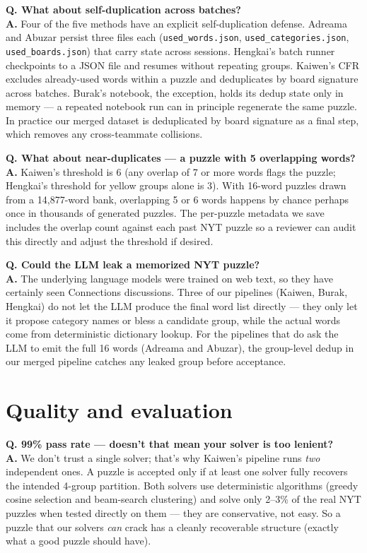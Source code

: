 \documentclass[11pt, letterpaper]{article}
\newcommand{\qitem}[1]{\vspace{0.6em}\noindent\textbf{\color{accent}Q. #1}\\[0.2em]}
\newcommand{\aitem}{\noindent\textbf{A.} }
\begin{document}
\qitem{What about self-duplication across batches?}
\aitem
Four of the five methods have an explicit self-duplication defense. Adreama
and Abuzar persist three files each (\texttt{used\_words.json},
\texttt{used\_categories.json}, \texttt{used\_boards.json}) that carry state
across sessions. Hengkai's batch runner checkpoints to a JSON file and
resumes without repeating groups. Kaiwen's CFR excludes already-used words
within a puzzle and deduplicates by board signature across batches. Burak's
notebook, the exception, holds its dedup state only in memory --- a repeated
notebook run can in principle regenerate the same puzzle. In practice our
merged dataset is deduplicated by board signature as a final step, which
removes any cross-teammate collisions.

\qitem{What about near-duplicates --- a puzzle with 5 overlapping words?}
\aitem
Kaiwen's threshold is 6 (any overlap of 7 or more words flags the puzzle;
Hengkai's threshold for yellow groups alone is 3). With 16-word puzzles
drawn from a 14{,}877-word bank, overlapping 5 or 6 words happens by chance
perhaps once in thousands of generated puzzles. The per-puzzle metadata we
save includes the overlap count against each past NYT puzzle so a reviewer
can audit this directly and adjust the threshold if desired.

\qitem{Could the LLM leak a memorized NYT puzzle?}
\aitem
The underlying language models were trained on web text, so they have
certainly seen Connections discussions. Three of our pipelines
(Kaiwen, Burak, Hengkai) do not let the LLM produce the final word list
directly --- they only let it propose category names or bless a candidate
group, while the actual words come from deterministic dictionary lookup. For
the pipelines that do ask the LLM to emit the full 16 words (Adreama and
Abuzar), the group-level dedup in our merged pipeline catches any leaked
group before acceptance.

\section*{Quality and evaluation}

\qitem{99\% pass rate --- doesn't that mean your solver is too lenient?}
\aitem
We don't trust a single solver; that's why Kaiwen's pipeline runs \emph{two}
independent ones. A puzzle is accepted only if at least one solver fully
recovers the intended 4-group partition. Both solvers use deterministic
algorithms (greedy cosine selection and beam-search clustering) and solve
only 2--3\% of the real NYT puzzles when tested directly on them --- they
are conservative, not easy. So a puzzle that our solvers \emph{can} crack
has a cleanly recoverable structure (exactly what a good puzzle should have).
\end{document}
